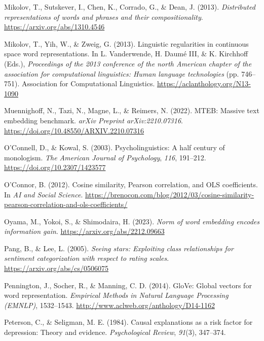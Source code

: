 \documentclass[
  man,
  floatsintext,
  longtable,
  nolmodern,
  notxfonts,
  notimes,
  colorlinks=true,linkcolor=blue,citecolor=blue,urlcolor=blue]{apa7}
\newlength{\cslhangindent}
\newenvironment{CSLReferences}[2] %
 {\begin{list}{}{%
  \setlength{\itemindent}{0pt}
  \setlength{\leftmargin}{0pt}
  \setlength{\parsep}{0pt}
  \ifodd #1
   \setlength{\leftmargin}{\cslhangindent}
   \setlength{\itemindent}{-1\cslhangindent}
  \fi
  \setlength{\itemsep}{#2\baselineskip}}}
 {\end{list}}
\begin{document}
\begin{CSLReferences}{1}{0}
Mikolov, T., Sutskever, I., Chen, K., Corrado, G., \& Dean, J. (2013).
\emph{Distributed representations of words and phrases and their
compositionality}. \url{https://arxiv.org/abs/1310.4546}

Mikolov, T., Yih, W., \& Zweig, G. (2013). Linguistic regularities in
continuous space word representations. In L. Vanderwende, H. Daumé III,
\& K. Kirchhoff (Eds.), \emph{Proceedings of the 2013 conference of the
north {A}merican chapter of the association for computational
linguistics: Human language technologies} (pp. 746--751). Association
for Computational Linguistics. \url{https://aclanthology.org/N13-1090}

Muennighoff, N., Tazi, N., Magne, L., \& Reimers, N. (2022). MTEB:
Massive text embedding benchmark. \emph{arXiv Preprint
arXiv:2210.07316}. \url{https://doi.org/10.48550/ARXIV.2210.07316}

O'Connell, D., \& Kowal, S. (2003). Psycholinguistics: A half century of
monologism. \emph{The American Journal of Psychology}, \emph{116},
191--212. \url{https://doi.org/10.2307/1423577}

O'Connor, B. (2012). Cosine similarity, {Pearson} correlation, and {OLS}
coefficients. In \emph{AI and Social Science}.
\url{https://brenocon.com/blog/2012/03/cosine-similarity-pearson-correlation-and-ols-coefficients/}

Oyama, M., Yokoi, S., \& Shimodaira, H. (2023). \emph{Norm of word
embedding encodes information gain}.
\url{https://arxiv.org/abs/2212.09663}

Pang, B., \& Lee, L. (2005). \emph{Seeing stars: Exploiting class
relationships for sentiment categorization with respect to rating
scales}. \url{https://arxiv.org/abs/cs/0506075}

Pennington, J., Socher, R., \& Manning, C. D. (2014). GloVe: Global
vectors for word representation. \emph{Empirical Methods in Natural
Language Processing (EMNLP)}, 1532--1543.
\url{http://www.aclweb.org/anthology/D14-1162}

Peterson, C., \& Seligman, M. E. (1984). Causal explanations as a risk
factor for depression: Theory and evidence. \emph{Psychological Review},
\emph{91}(3), 347--374.


\end{CSLReferences}
\end{document}
